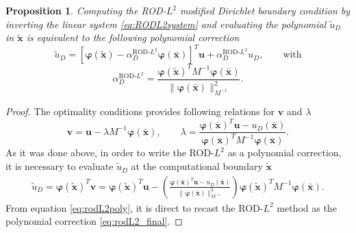 \documentclass{article}
\renewcommand{\phi}{\varphi}
\newtheorem{proposition}[theorem]{Proposition}%
\begin{document}
\begin{proposition}
Computing the ROD-$L^2$ modified Dirichlet boundary condition by inverting the linear system \eqref{eq:RODL2system} and evaluating the polynomial $\tilde u_D$ in $\tilde{\boldsymbol{x}}$ is equivalent to the following polynomial correction
\begin{equation}\label{eq:rodL2_final}
    \tilde u_D = [\boldsymbol{\phi}(\tilde{\boldsymbol{x}}) - \alpha_D^{\text{ROD-$L^2$}} \boldsymbol{\phi}(\bar{\boldsymbol{x}})]^T \boldsymbol{u} + \alpha_D^{\text{ROD-$L^2$}} u_D , \quad \quad \text{with}
\end{equation}
\begin{equation}\label{eq:alpha_rod_L2}
    \alpha_D^{\text{ROD-$L^2$}} = \frac{\boldsymbol{\phi}(\tilde{\boldsymbol{x}})^T M^{-1} \boldsymbol{\phi}(\bar{\boldsymbol{x}})}{\|\boldsymbol{\phi}(\bar{\boldsymbol{x}})\|^2_{M^{-1}}}.
\end{equation}

\end{proposition}

\begin{proof}

The optimality conditions provides following relations for $\boldsymbol{v}$ and $\lambda$
\[
\boldsymbol{v} = \boldsymbol{u} - \lambda M^{-1} \boldsymbol{\phi}(\bar{\boldsymbol{x}}),\qquad \lambda = \frac{\boldsymbol{\phi}(\bar{\boldsymbol{x}})^T \boldsymbol{u} - u_D(\bar{\boldsymbol{x}})}{\boldsymbol{\phi}(\bar{\boldsymbol{x}})^T M^{-1} \boldsymbol{\phi}(\bar{\boldsymbol{x}})}.
\]
%
As it was done above, in order to write the ROD-$L^2$ as a polynomial correction, it is necessary to evaluate $\tilde u_D$ at the computational boundary $\tilde{\boldsymbol{x}}$
\begin{equation}\label{eq:rodL2poly}
\begin{split}
    \tilde u_D = \boldsymbol{\phi}(\tilde{\boldsymbol{x}})^T \boldsymbol{v} = \boldsymbol{\phi}(\tilde{\boldsymbol{x}})^T \boldsymbol{u} - \left( \frac{\boldsymbol{\phi}(\bar{\boldsymbol{x}})^T \boldsymbol{u} - u_D(\bar{\boldsymbol{x}})}{\|\boldsymbol{\phi}(\bar{\boldsymbol{x}})\|^2_{M^{-1}}} \right) \boldsymbol{\phi}(\tilde{\boldsymbol{x}})^T M^{-1} \boldsymbol{\phi}(\bar{\boldsymbol{x}}).
\end{split}
\end{equation}
From equation \eqref{eq:rodL2poly}, it is direct to recast the ROD-$L^2$ method as the polynomial correction \eqref{eq:rodL2_final}. 

\end{proof}
\end{document}
